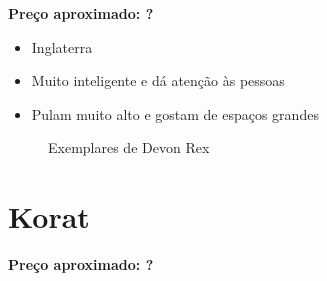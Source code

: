 \documentclass[a4paper]{article}
\begin{document}
  \bf{Pre\c{c}o aproximado:} ?

  \begin{itemize}
    \item Inglaterra
    \item Muito inteligente e d\'a aten\c{c}\~ao \`as pessoas
    \item Pulam muito alto e gostam de espa\c{c}os grandes
  \end{itemize}

  \begin{figure}[ht]
    \centering


    \caption{Exemplares de Devon Rex}
    \label{fig:devon-rex}
  \end{figure}

  \section{Korat}

  \bf{Pre\c{c}o aproximado:} ?
\end{document}
